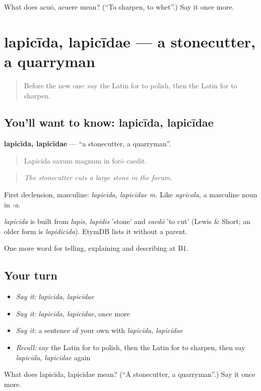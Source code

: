 \begin{tcolorbox}[breakable,colback=teal!4,colframe=teal!35!black,title={Before you move on}]
What does acuō, acuere mean? (\textquotedblleft{}To sharpen, to whet\textquotedblright{}.) Say it once more.
\end{tcolorbox}
\section[lapicīda, lapicīdae]{lapicīda, lapicīdae — a stonecutter, a quarryman}

\label{lesson:LA-C471-lapicida}



\begin{quote}
Before the new one: say the Latin for to polish, then the Latin for to sharpen.
\end{quote}

\subsection*{You'll want to know: lapicīda, lapicīdae}
\textbf{lapicīda, lapicīdae} — \textquotedblleft{}a stonecutter, a quarryman\textquotedblright{}.

\begin{quote}
Lapicīda saxum magnum in forō caedit.
\end{quote}

\begin{quote}
\emph{The stonecutter cuts a large stone in the forum.}
\end{quote}

First declension, masculine: \emph{lapicīda, lapicīdae m.} Like \emph{agricola}, a masculine noun in \emph{-a}.

\begin{cousinweb}
\emph{lapicīda} is built from \emph{lapis, lapidis} 'stone' and \emph{caedō} 'to cut' (Lewis \& Short; an older form is \emph{lapidicīda}). EtymDB lists it without a parent.
\end{cousinweb}

\begin{grammarlens}[title={What you've built}]
One more word for telling, explaining and describing at B1.
\end{grammarlens}

\subsection*{Your turn}
\begin{itemize}
\raggedright
  \item \emph{Say it:} \emph{lapicīda, lapicīdae}
  \item \emph{Say it:} \emph{lapicīda, lapicīdae}, once more
  \item \emph{Say it:} a sentence of your own with \emph{lapicīda, lapicīdae}
  \item \emph{Recall:} say the Latin for to polish, then the Latin for to sharpen, then say \emph{lapicīda, lapicīdae} again
\end{itemize}

\begin{tcolorbox}[breakable,colback=teal!4,colframe=teal!35!black,title={Before you move on}]
What does lapicīda, lapicīdae mean? (\textquotedblleft{}A stonecutter, a quarryman\textquotedblright{}.) Say it once more.
\end{tcolorbox}
